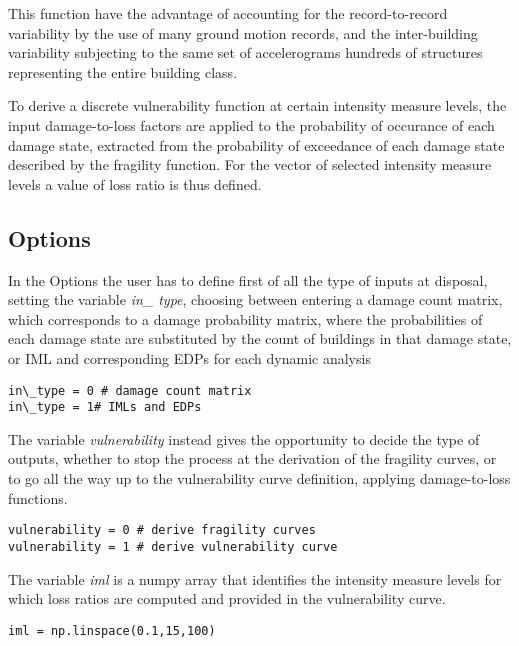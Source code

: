 This function have the advantage of accounting for the record-to-record variability by the use of many ground motion records, and the inter-building variability subjecting to the same set of accelerograms hundreds of structures representing the entire building class.

To derive a discrete vulnerability function at certain intensity measure levels, the input damage-to-loss factors are applied to the probability of occurance of each damage state, extracted from the probability of exceedance of each damage state described by the fragility function. For the vector of selected intensity measure levels a value of loss ratio is thus defined.

\subsection{Options}
\label{subsec:NDMoptions}
In the Options the user has to define first of all the type of inputs at disposal, setting the variable \textit{in\_ type}, choosing between entering a damage count matrix, which corresponds to a damage probability matrix, where the probabilities of each damage state are substituted by the count of buildings in that damage state, or IML and corresponding EDPs for each dynamic analysis

\begin{Verbatim}[frame=single, commandchars=\\\{\}, samepage=true]
in\_type = 0 # damage count matrix 
in\_type = 1# IMLs and EDPs 
\end{Verbatim}

The variable \textit{vulnerability} instead gives the opportunity to decide the type of outputs, whether to stop the process at the derivation of the fragility curves, or to go all the way up to the vulnerability curve definition, applying damage-to-loss functions.

\begin{Verbatim}[frame=single, commandchars=\\\{\}, samepage=true]
vulnerability = 0 # derive fragility curves 
vulnerability = 1 # derive vulnerability curve
\end{Verbatim}

The variable \textit{iml} is a numpy array that identifies the intensity measure levels for which loss ratios are computed and provided in the vulnerability curve.

\begin{Verbatim}[frame=single, commandchars=\\\{\}, samepage=true]
iml = np.linspace(0.1,15,100)
\end{Verbatim}

